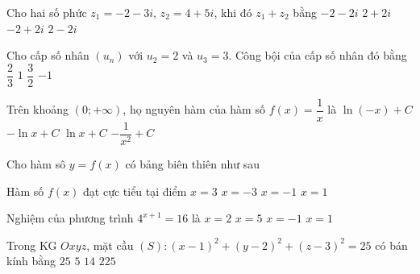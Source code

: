 \begin{ex}%
	Cho hai số phức $z_1=-2-3i$, $z_2=4+5i$, khi đó $z_1+z_2$ bằng
	\choice
	{$-2-2i$}
	{\True $2+2i$}
	{$-2+2i$}
	{$2-2i$}
\end{ex}

\begin{ex}%
	Cho cấp số nhân $\left(u_{n}\right)$ với $u_2=2$ và $u_3=3$. Công bội của cấp số nhân đó bằng
	\choice
	{$\dfrac{2}{3}$}
	{$1$}
	{\True $\dfrac{3}{2}$}
	{$-1$}
\end{ex}

\begin{ex}%
	Trên khoảng $(0;+\infty)$, họ nguyên hàm của hàm số $f(x)=\dfrac{1}{x}$ là
	\choice
	{$\ln (-x)+C$}
	{$-\ln x+C$}
	{\True $\ln x+C$}
	{$-\dfrac{1}{x^2}+C$}
\end{ex}

\begin{ex}%
	Cho hàm sô $y=f(x)$ có bảng biên thiên như sau
	\begin{center}
	\end{center}
	Hàm số $f(x)$ đạt cực tiểu tại điểm
	\choice
	{\True $x=3$}
	{$x=-3$}
	{$x=-1$}
	{$x=1$}
\end{ex}

\begin{ex}%
	Nghiệm của phương trình $4^{x+1}=16$ là
	\choice
	{$x=2$}
	{$x=5$}
	{$x=-1$}
	{\True $x=1$}
\end{ex}

\begin{ex}%
	Trong KG $Oxyz$, mặt cầu $(S) \colon (x-1)^2+(y-2)^2+(z-3)^2=25$ có bán kính bằng
	\choice
	{$25$}
	{\True $5$}
	{$14$}
	{$225$}
\end{ex}

